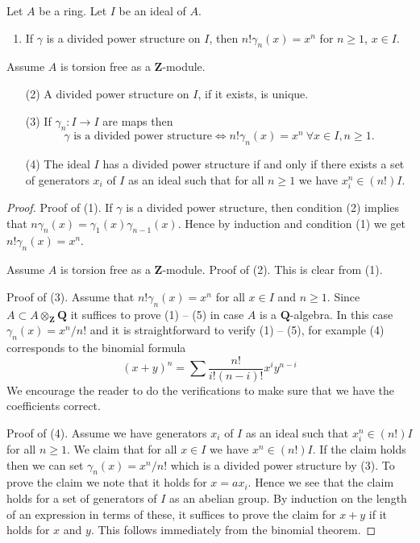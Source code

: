 \begin{lemma}
\label{lemma-silly}
Let $A$ be a ring. Let $I$ be an ideal of $A$.
\begin{enumerate}
\item If $\gamma$ is a divided power structure on $I$, then
$n! \gamma_n(x) = x^n$ for $n \geq 1$, $x \in I$.
\end{enumerate}
Assume $A$ is torsion free as a $\mathbf{Z}$-module.
\begin{enumerate}
\item[(2)] A divided power structure on $I$, if it exists, is unique.
\item[(3)] If $\gamma_n : I \to I$ are maps then
$$
\gamma\text{ is a divided power structure}
\Leftrightarrow
n! \gamma_n(x) = x^n\ \forall x \in I, n \geq 1.
$$
\item[(4)] The ideal $I$ has a divided power structure
if and only if there exists
a set of generators $x_i$ of $I$ as an ideal such that
for all $n \geq 1$ we have $x_i^n \in (n!)I$.
\end{enumerate}
\end{lemma}

\begin{proof}
Proof of (1). If $\gamma$ is a divided power structure, then condition
(2) implies that $n \gamma_n(x) = \gamma_1(x)\gamma_{n - 1}(x)$. Hence
by induction and condition (1) we get $n! \gamma_n(x) = x^n$.

\medskip\noindent
Assume $A$ is torsion free as a $\mathbf{Z}$-module.
Proof of (2). This is clear from (1).

\medskip\noindent
Proof of (3). Assume that $n! \gamma_n(x) = x^n$ for all $x \in I$ and
$n \geq 1$. Since $A \subset A \otimes_{\mathbf{Z}} \mathbf{Q}$ it suffices
to prove (1) -- (5) in case $A$ is a $\mathbf{Q}$-algebra.
In this case $\gamma_n(x) = x^n/n!$ and it is straightforward
to verify (1) -- (5), for example (4) corresponds to the binomial
formula
$$
(x + y)^n = \sum \frac{n!}{i!(n - i)!} x^iy^{n - i}
$$
We encourage the reader to do the verifications
to make sure that we have the coefficients correct.

\medskip\noindent
Proof of (4). Assume we have generators $x_i$ of $I$ as an ideal
such that $x_i^n \in (n!)I$ for all $n \geq 1$. We claim that
for all $x \in I$ we have $x^n \in (n!)I$. If the claim holds then
we can set $\gamma_n(x) = x^n/n!$ which is a divided power structure by (3).
To prove the claim we note that it holds for $x = ax_i$. Hence we see
that the claim holds for a set of generators of $I$ as an abelian group.
By induction on the length of an expression in terms of these, it suffices
to prove the claim for $x + y$ if it holds for $x$ and $y$. This
follows immediately from the binomial theorem.
\end{proof}

